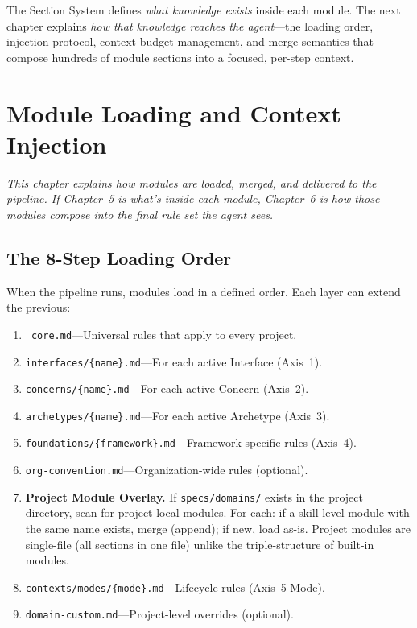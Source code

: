 \documentclass[11pt,a4paper,openright,twoside]{report}
\newcommand{\file}[1]{\texttt{#1}}
\begin{document}
The Section System defines \emph{what knowledge exists} inside each module. The next chapter explains \emph{how that knowledge reaches the agent}---the loading order, injection protocol, context budget management, and merge semantics that compose hundreds of module sections into a focused, per-step context.

\chapter{Module Loading and Context Injection}
\label{ch:injection}

\textit{This chapter explains how modules are loaded, merged, and delivered to the pipeline. If Chapter~5 is what's inside each module, Chapter~6 is how those modules compose into the final rule set the agent sees.}

\section{The 8-Step Loading Order}
\label{sec:loading-order}

When the pipeline runs, modules load in a defined order. Each layer can extend the previous:

\begin{enumerate}
  \item \file{\_core.md}---Universal rules that apply to every project.
  \item \file{interfaces/\{name\}.md}---For each active Interface (Axis~1).
  \item \file{concerns/\{name\}.md}---For each active Concern (Axis~2).
  \item \file{archetypes/\{name\}.md}---For each active Archetype (Axis~3).
  \item \file{foundations/\{framework\}.md}---Framework-specific rules (Axis~4).
  \item \file{org-convention.md}---Organization-wide rules (optional).
  \item[Step 6b] \textbf{Project Module Overlay.} If \file{specs/domains/} exists in the project directory, scan for project-local modules. For each: if a skill-level module with the same name exists, merge (append); if new, load as-is. Project modules are single-file (all sections in one file) unlike the triple-structure of built-in modules.
  \item \file{contexts/modes/\{mode\}.md}---Lifecycle rules (Axis~5 Mode).
  \item \file{domain-custom.md}---Project-level overrides (optional).
\end{enumerate}
\end{document}
